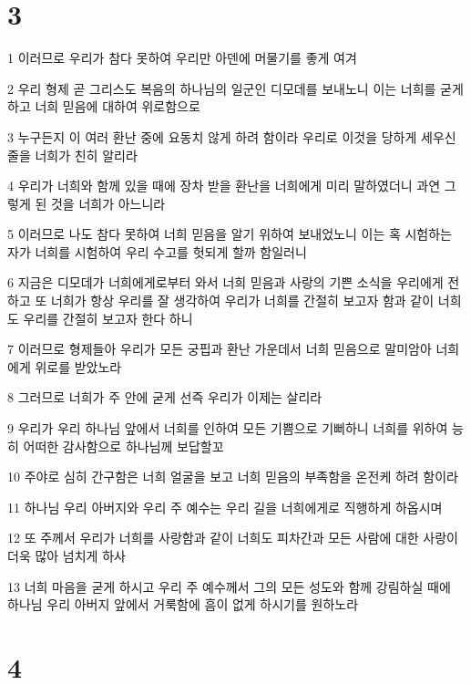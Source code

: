 \chapter{3}

\par 1 이러므로 우리가 참다 못하여 우리만 아덴에 머물기를 좋게 여겨
\par 2 우리 형제 곧 그리스도 복음의 하나님의 일군인 디모데를 보내노니 이는 너희를 굳게 하고 너희 믿음에 대하여 위로함으로
\par 3 누구든지 이 여러 환난 중에 요동치 않게 하려 함이라 우리로 이것을 당하게 세우신 줄을 너희가 친히 알리라
\par 4 우리가 너희와 함께 있을 때에 장차 받을 환난을 너희에게 미리 말하였더니 과연 그렇게 된 것을 너희가 아느니라
\par 5 이러므로 나도 참다 못하여 너희 믿음을 알기 위하여 보내었노니 이는 혹 시험하는 자가 너희를 시험하여 우리 수고를 헛되게 할까 함일러니
\par 6 지금은 디모데가 너희에게로부터 와서 너희 믿음과 사랑의 기쁜 소식을 우리에게 전하고 또 너희가 항상 우리를 잘 생각하여 우리가 너희를 간절히 보고자 함과 같이 너희도 우리를 간절히 보고자 한다 하니
\par 7 이러므로 형제들아 우리가 모든 궁핍과 환난 가운데서 너희 믿음으로 말미암아 너희에게 위로를 받았노라
\par 8 그러므로 너희가 주 안에 굳게 선즉 우리가 이제는 살리라
\par 9 우리가 우리 하나님 앞에서 너희를 인하여 모든 기쁨으로 기뻐하니 너희를 위하여 능히 어떠한 감사함으로 하나님께 보답할꼬
\par 10 주야로 심히 간구함은 너희 얼굴을 보고 너희 믿음의 부족함을 온전케 하려 함이라
\par 11 하나님 우리 아버지와 우리 주 예수는 우리 길을 너희에게로 직행하게 하옵시며
\par 12 또 주께서 우리가 너희를 사랑함과 같이 너희도 피차간과 모든 사람에 대한 사랑이 더욱 많아 넘치게 하사
\par 13 너희 마음을 굳게 하시고 우리 주 예수께서 그의 모든 성도와 함께 강림하실 때에 하나님 우리 아버지 앞에서 거룩함에 흠이 없게 하시기를 원하노라

\chapter{4}

